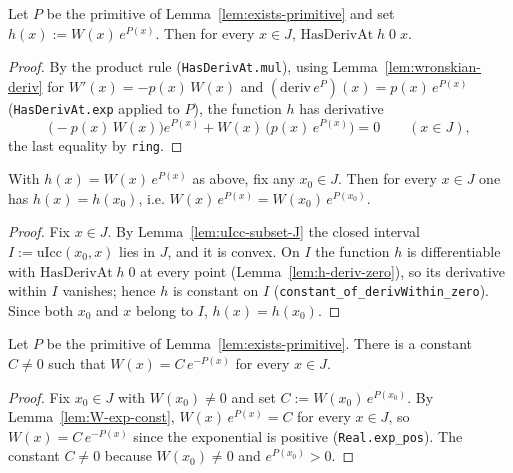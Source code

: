 \begin{lemma}
    \label{lem:h-deriv-zero}
    \leanok
    Let $P$ be the primitive of Lemma~\ref{lem:exists-primitive} and set
    $h(x) := W(x)\,e^{P(x)}$. Then for every $x \in J$,
    $\mathrm{HasDerivAt}\;h\;0\;x$.
\end{lemma}
\begin{proof}
    By the product rule (\texttt{HasDerivAt.mul}), using
    Lemma~\ref{lem:wronskian-deriv} for $W'(x) = -p(x)\,W(x)$ and
    $(\mathrm{deriv}\,e^{P})(x) = p(x)\,e^{P(x)}$
    (\texttt{HasDerivAt.exp} applied to $P$), the function $h$ has derivative
    \[
        \bigl(-p(x)\,W(x)\bigr)e^{P(x)} + W(x)\,\bigl(p(x)\,e^{P(x)}\bigr)
        = 0
        \qquad (x \in J),
    \]
    the last equality by \texttt{ring}.
\end{proof}

\begin{lemma}[$W\,e^{P}$ is constant on $J$]
    \label{lem:W-exp-const}
    \leanok
    With $h(x) = W(x)\,e^{P(x)}$ as above, fix any $x_0 \in J$. Then for every
    $x \in J$ one has $h(x) = h(x_0)$, i.e.
    $W(x)\,e^{P(x)} = W(x_0)\,e^{P(x_0)}$.
\end{lemma}
\begin{proof}
    Fix $x \in J$. By Lemma~\ref{lem:uIcc-subset-J} the closed interval
    $I := \mathrm{uIcc}(x_0, x)$ lies in $J$, and it is convex. On $I$ the
    function $h$ is differentiable with $\mathrm{HasDerivAt}\;h\;0$ at every
    point (Lemma~\ref{lem:h-deriv-zero}), so its derivative within $I$ vanishes;
    hence $h$ is constant on $I$ (\texttt{constant\_of\_derivWithin\_zero}).
    Since both $x_0$ and $x$ belong to $I$, $h(x) = h(x_0)$.
\end{proof}

\begin{lemma}
    \label{lem:W-formula}
    \leanok
    Let $P$ be the primitive of Lemma~\ref{lem:exists-primitive}. There is a
    constant $C \ne 0$ such that $W(x) = C\,e^{-P(x)}$ for every $x \in J$.
\end{lemma}
\begin{proof}
    Fix $x_0 \in J$ with $W(x_0) \ne 0$ and set $C := W(x_0)\,e^{P(x_0)}$. By
    Lemma~\ref{lem:W-exp-const}, $W(x)\,e^{P(x)} = C$ for every $x \in J$, so
    $W(x) = C\,e^{-P(x)}$ since the exponential is positive
    (\texttt{Real.exp\_pos}). The constant $C \ne 0$ because $W(x_0) \ne 0$ and
    $e^{P(x_0)} > 0$.
\end{proof}

